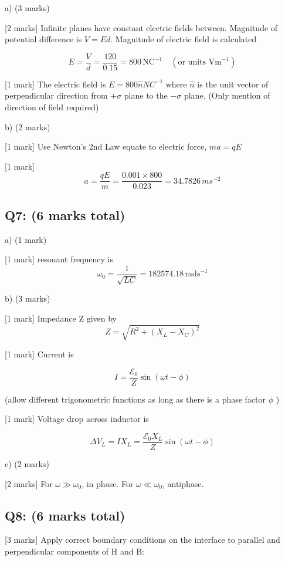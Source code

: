 \documentclass[a4paper,11pt]{article}
\begin{document}
a) (3 marks)

[2 marks] Infinite planes have constant electric fields between. Magnitude of potential difference is \( V = Ed \). Magnitude of electric field is calculated 

\[ E = \frac{V}{d} = \frac{120}{0.15} = 800 \, \text{NC}^{-1} \quad (\text{or units } \mathrm{Vm}^{-1}) \]

[1 mark] The electric field is \(E = 800 \hat{n} NC^{-1} \) where \( \hat{n} \) is the unit vector of perpendicular direction from \( +\sigma \) plane to the \( -\sigma \) plane. (Only mention of direction of field required)

b) (2 marks)

[1 mark] Use Newton’s 2nd Law equate to electric force, \( ma = qE \)

[1 mark] \[ a = \frac{qE}{m} = \frac{0.001 \times 800}{0.023} = 34.7826 \, ms^{-2} \]

\subsection*{Q7: (6 marks total)}

a) (1 mark) 

[1 mark]  resonant frequency is 
\[ \omega_0 = \frac{1}{\sqrt{LC}} = 182574.18 \, \mathrm{rads}^{-1} \]

b) (3 marks)

[1 mark] Impedance Z given by 
\[ Z = \sqrt{R^2 + (X_L - X_C)^2} \]

[1 mark] Current is

\[ I =  \frac{\mathcal{E}_0}{Z} \sin(\omega t - \phi) \]

(allow different trigonometric functions as long as there is a phase factor \( \phi \) ) 

[1 mark] Voltage drop across inductor is 

\[ \Delta{V_L} = I X_L = \frac{\mathcal{E}_0 X_L}{Z} \sin(\omega t - \phi) \]

c) (2 marks)

[2 marks] For \( \omega \gg \omega_{0} \), in phase. For \( \omega \ll \omega_{0} \), antiphase.  

\subsection*{Q8: (6 marks total)}

[3 marks] Apply correct boundary conditions on the interface to parallel and perpendicular components of H and B:
\end{document}
